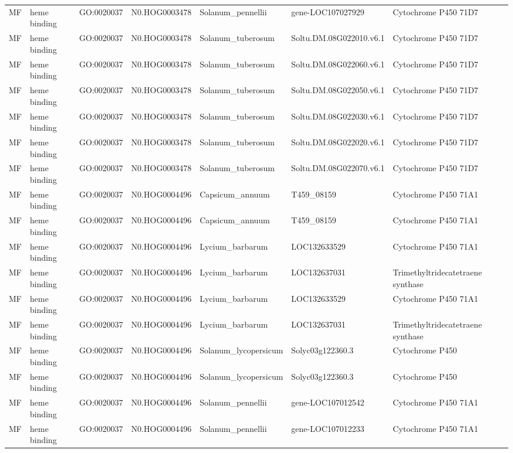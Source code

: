 \begin{table}
\begin{tabular}[t]{lllllll}
MF & heme binding & GO:0020037 & N0.HOG0003478 & Solanum\_pennellii & gene-LOC107027929 & Cytochrome P450 71D7\\
MF & heme binding & GO:0020037 & N0.HOG0003478 & Solanum\_tuberosum & Soltu.DM.08G022010.v6.1 & Cytochrome P450 71D7\\
MF & heme binding & GO:0020037 & N0.HOG0003478 & Solanum\_tuberosum & Soltu.DM.08G022060.v6.1 & Cytochrome P450 71D7\\
MF & heme binding & GO:0020037 & N0.HOG0003478 & Solanum\_tuberosum & Soltu.DM.08G022050.v6.1 & Cytochrome P450 71D7\\
MF & heme binding & GO:0020037 & N0.HOG0003478 & Solanum\_tuberosum & Soltu.DM.08G022030.v6.1 & Cytochrome P450 71D7\\
MF & heme binding & GO:0020037 & N0.HOG0003478 & Solanum\_tuberosum & Soltu.DM.08G022020.v6.1 & Cytochrome P450 71D7\\
MF & heme binding & GO:0020037 & N0.HOG0003478 & Solanum\_tuberosum & Soltu.DM.08G022070.v6.1 & Cytochrome P450 71D7\\
MF & heme binding & GO:0020037 & N0.HOG0004496 & Capsicum\_annuum & T459\_08159 & Cytochrome P450 71A1\\
MF & heme binding & GO:0020037 & N0.HOG0004496 & Capsicum\_annuum & T459\_08159 & Cytochrome P450 71A1\\
MF & heme binding & GO:0020037 & N0.HOG0004496 & Lycium\_barbarum & LOC132633529 & Cytochrome P450 71A1\\
MF & heme binding & GO:0020037 & N0.HOG0004496 & Lycium\_barbarum & LOC132637031 & Trimethyltridecatetraene synthase\\
MF & heme binding & GO:0020037 & N0.HOG0004496 & Lycium\_barbarum & LOC132633529 & Cytochrome P450 71A1\\
MF & heme binding & GO:0020037 & N0.HOG0004496 & Lycium\_barbarum & LOC132637031 & Trimethyltridecatetraene synthase\\
MF & heme binding & GO:0020037 & N0.HOG0004496 & Solanum\_lycopersicum & Solyc03g122360.3 & Cytochrome P450\\
MF & heme binding & GO:0020037 & N0.HOG0004496 & Solanum\_lycopersicum & Solyc03g122360.3 & Cytochrome P450\\
MF & heme binding & GO:0020037 & N0.HOG0004496 & Solanum\_pennellii & gene-LOC107012542 & Cytochrome P450 71A1\\
MF & heme binding & GO:0020037 & N0.HOG0004496 & Solanum\_pennellii & gene-LOC107012233 & Cytochrome P450 71A1\\

\end{tabular}
\end{table}
